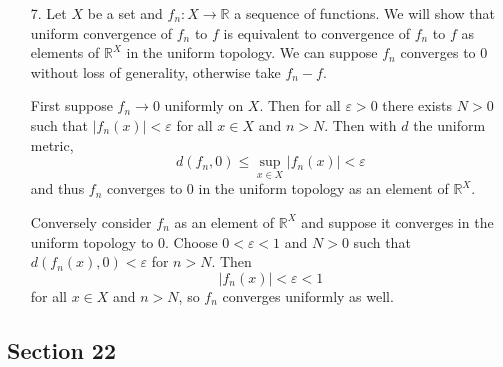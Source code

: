 \documentclass[11pt, reqno]{article}
\theoremstyle{plain}
\theoremstyle{definition}
\theoremstyle{remark}
\renewcommand{\epsilon}{\varepsilon}
\newcommand{\RR}{\mathbb{R}}
\begin{document}
\begin{enumerate}
    \item[7.] Let $X$ be a set and $f_n: X \rightarrow \RR$ a sequence of functions. We will show that uniform convergence
    of $f_n$ to $f$ is equivalent to convergence of $f_n$ to $f$ as elements of $\RR^X$ in the uniform topology. We can
    suppose $f_n$ converges to $0$ without loss of generality, otherwise take $f_n - f$.

    First suppose $f_n \rightarrow 0$ uniformly on $X$. Then for all $\epsilon > 0$ there exists $N > 0$
    such that $|f_n(x)| < \epsilon$ for all $x \in X$ and $n > N$. Then with $d$ the uniform metric,
    \[
        d(f_n, 0) \leq \sup\limits_{x \in X} |f_n(x)| < \epsilon
    \]
    and thus $f_n$ converges to $0$ in the uniform topology as an element of $\RR^X$.

    Conversely consider $f_n$ as an element of $\RR^X$ and suppose it converges in the uniform topology to $0$. 
    Choose $0 < \epsilon < 1$ and $N > 0$ such that $d(f_n(x), 0) < \epsilon$ for $n > N$. Then
    \[
        |f_n(x)| < \epsilon < 1
    \]
    for all $x \in X$ and $n > N$, so $f_n$ converges uniformly as well.
\end{enumerate}

\subsection*{Section 22}
\end{document}
